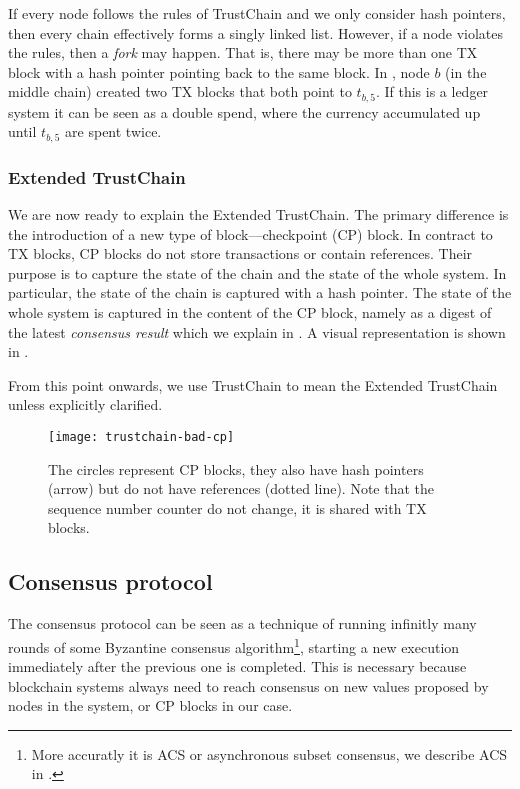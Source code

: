 If every node follows the rules of TrustChain and we only consider hash pointers,
then every chain effectively forms a singly linked list.
However, if a node violates the rules, then a \emph{fork} may happen.
That is, there may be more than one TX block with a hash pointer pointing back to the same block.
In , node $b$ (in the middle chain) created two TX blocks that both point to $t_{b, 5}$.
If this is a ledger system it can be seen as a double spend, where the currency accumulated up until $t_{b, 5}$ are spent twice.

\subsubsection*{Extended TrustChain}
We are now ready to explain the Extended TrustChain.
The primary difference is the introduction of a new type of block---checkpoint (CP) block.
In contract to TX blocks, CP blocks do not store transactions or contain references.
Their purpose is to capture the state of the chain and the state of the whole system.
In particular, the state of the chain is captured with a hash pointer.
The state of the whole system is captured in the content of the CP block,
namely as a digest of the latest \emph{consensus result} which we explain in .
A visual representation is shown in .

From this point onwards, we use TrustChain to mean the Extended TrustChain unless explicitly clarified.

\begin{figure}
    \texttt{[image: trustchain-bad-cp]}
    \centering
    \caption{The circles represent CP blocks,
    they also have hash pointers (arrow) but do not have references (dotted line).
    Note that the sequence number counter do not change, it is shared with TX blocks.}
    \label{fig:trustchain-bad-cp}
\end{figure}

\subsection{Consensus protocol}\label{sec:overview-cons}

The consensus protocol can be seen as a technique of running infinitly many rounds of some 
Byzantine consensus algorithm\footnote{More accuratly it is ACS or asynchronous subset consensus, we describe ACS in .},
starting a new execution immediately after the previous one is completed.
This is necessary because blockchain systems always need to reach consensus on new values proposed by nodes in the system,
or CP blocks in our case.

